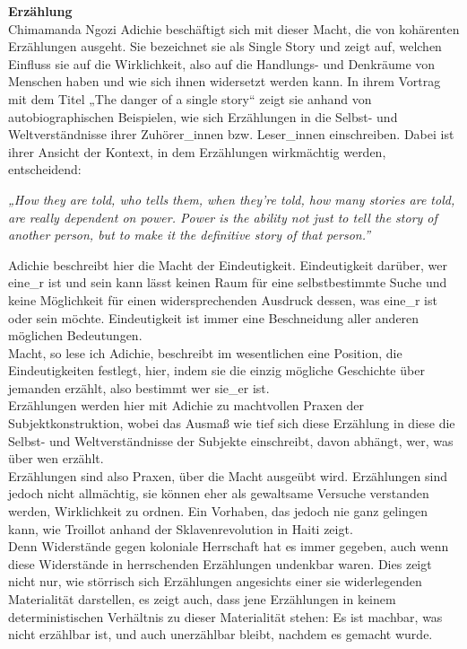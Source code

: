 \noindent\textbf{\large Erzählung}\\
Chimamanda Ngozi Adichie beschäftigt sich mit dieser Macht, die von kohärenten
Erzählungen ausgeht. Sie bezeichnet sie als Single Story und zeigt auf, welchen
Einfluss sie auf die Wirklichkeit, also auf die Handlungs- und Denkräume von
Menschen haben und wie sich ihnen widersetzt werden kann. In ihrem Vortrag mit
dem Titel „The danger of a single story“\footnotemark{} 
 zeigt sie anhand von
autobiographischen Beispielen, wie sich Erzählungen in die Selbst- und
Weltverständnisse ihrer Zuhörer\_innen bzw. Leser\_innen einschreiben. Dabei ist
ihrer Ansicht der Kontext, in dem Erzählungen wirkmächtig werden, entscheidend:

\begin{myenv}
  \textit{„How they are told, who tells them, when they're told, how many
stories are told, are really dependent on power. Power is the ability not just
to tell the story of another person, but to make it the definitive story of
that person.” \footnotemark{} } 
\end{myenv}
Adichie beschreibt hier die Macht der Eindeutigkeit. Eindeutigkeit darüber, wer
eine\_r ist und sein kann lässt keinen Raum für eine selbstbestimmte Suche und
keine Möglichkeit für einen widersprechenden Ausdruck dessen, was eine\_r ist oder
sein möchte. Eindeutigkeit ist immer eine Beschneidung aller anderen möglichen
Bedeutungen.\\
Macht, so lese ich Adichie, beschreibt im wesentlichen eine
Position, die Eindeutigkeiten festlegt, hier, indem sie die einzig mögliche
Geschichte über jemanden erzählt, also bestimmt wer sie\_er ist.\\

\noindent Erzählungen werden hier mit Adichie zu machtvollen Praxen der
Subjektkonstruktion, wobei das Ausmaß wie tief sich diese Erzählung in diese
die Selbst- und Weltverständnisse der Subjekte einschreibt, davon abhängt, wer,
was über wen erzählt.\\
Erzählungen sind also Praxen, über die Macht ausgeübt wird. Erzählungen sind
jedoch nicht allmächtig, sie können eher als gewaltsame Versuche verstanden
werden, Wirklichkeit zu ordnen. Ein Vorhaben, das jedoch nie ganz gelingen
kann, wie Troillot anhand der Sklavenrevolution in Haiti zeigt.\\
Denn Widerstände gegen koloniale Herrschaft hat es immer gegeben, auch wenn diese
Widerstände in  herrschenden Erzählungen undenkbar waren. Dies zeigt nicht nur,
wie störrisch sich Erzählungen angesichts einer sie widerlegenden Materialität
darstellen, es zeigt auch, dass jene Erzählungen in keinem deterministischen
Verhältnis zu dieser Materialität stehen: Es ist machbar, was nicht erzählbar
ist, und auch unerzählbar bleibt, nachdem es gemacht wurde.\\

